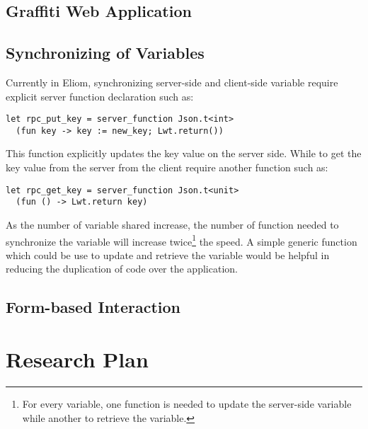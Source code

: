 \documentclass[12pt,fullpage]{article}
\begin{document}
\subsection{Graffiti Web Application}

\subsection{Synchronizing of Variables}
Currently in Eliom, synchronizing server-side and client-side variable require
explicit server function declaration such as:
\begin{verbatim}
let rpc_put_key = server_function Json.t<int>
  (fun key -> key := new_key; Lwt.return())
\end{verbatim}
This function explicitly updates the key value on the server side. While to
get the key value from the server from the client require another function
such as:
\begin{verbatim}
let rpc_get_key = server_function Json.t<unit>
  (fun () -> Lwt.return key)
\end{verbatim}
As the number of variable shared increase, the number of function needed to
synchronize the variable will increase twice\footnote{For every variable,
one function is needed to update the server-side variable while another to
retrieve the variable.} the speed. A simple generic function which could
be use to update and retrieve the variable would be helpful in reducing
the duplication of code over the application.


\subsection{Form-based Interaction}
\section{Research Plan}

\printbibliography
\end{document}
